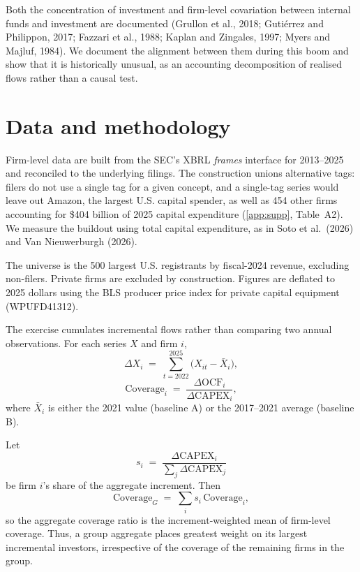 \documentclass[preprint,11pt]{elsarticle}
\begin{document}
Both the concentration of investment and firm-level covariation between internal funds and
investment are documented (Grullon et al., 2018; Guti\'errez and Philippon, 2017; Fazzari et al.,
1988; Kaplan and Zingales, 1997; Myers and Majluf, 1984). We document the alignment between them
during this boom and show that it is historically unusual, as an accounting decomposition of
realised flows rather than a causal test.

\section{Data and methodology}
Firm-level data are built from the SEC's XBRL \emph{frames} interface for 2013--2025 and reconciled
to the underlying filings. The construction unions alternative tags: filers do not use a single tag
for a given concept, and a single-tag series would leave out Amazon, the largest U.S. capital
spender, as well as 454 other firms accounting for \$404 billion of 2025 capital expenditure
(\ref{app:supp}, Table~A2). We measure the buildout using total capital expenditure, as in Soto et
al.\ (2026) and Van Nieuwerburgh (2026).

The universe is the 500 largest U.S. registrants by fiscal-2024 revenue, excluding non-filers.
Private firms are excluded by construction. Figures are deflated to 2025 dollars using the BLS
producer price index for private capital equipment (WPUFD41312).

The exercise cumulates incremental flows rather than comparing two annual observations. For each
series $X$ and firm $i$,
\begin{equation}
\Delta X_i \;=\; \sum_{t=2022}^{2025}\bigl(X_{it}-\bar{X}_i\bigr),
\label{eq:cum}
\end{equation}
\begin{equation}
\mathrm{Coverage}_i \;=\; \frac{\Delta \mathrm{OCF}_i}{\Delta \mathrm{CAPEX}_i},
\label{eq:cov}
\end{equation}
where $\bar{X}_i$ is either the 2021 value (baseline A) or the 2017--2021 average (baseline B).

Let
\[
s_i \;=\; \frac{\Delta \mathrm{CAPEX}_i}{\sum_j \Delta \mathrm{CAPEX}_j}
\]
be firm $i$'s share of the aggregate increment. Then
\begin{equation}
\mathrm{Coverage}_G \;=\; \sum_i s_i\,\mathrm{Coverage}_i ,
\label{eq:agg}
\end{equation}
so the aggregate coverage ratio is the increment-weighted mean of firm-level coverage. Thus, a group
aggregate places greatest weight on its largest incremental investors, irrespective of the coverage
of the remaining firms in the group.
\end{document}
